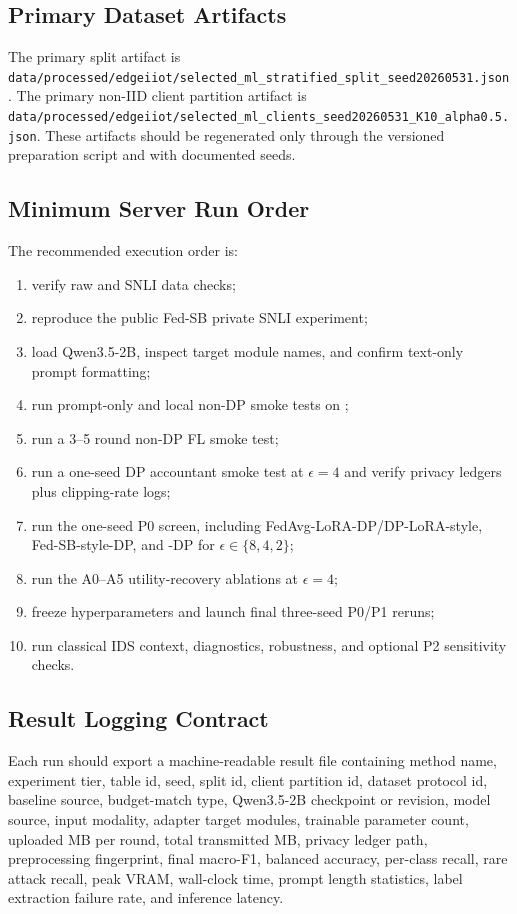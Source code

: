 \subsection{Primary Dataset Artifacts}
The primary split artifact is \texttt{data/processed/edgeiiot/selected\_ml\_stratified\_split\_seed20260531.json}. The primary non-IID client partition artifact is \texttt{data/processed/edgeiiot/selected\_ml\_clients\_seed20260531\_K10\_alpha0.5.json}. These artifacts should be regenerated only through the versioned preparation script and with documented seeds.

\subsection{Minimum Server Run Order}
The recommended execution order is:
\begin{enumerate}[leftmargin=*]
  \item verify raw \dataset{} and SNLI data checks;
  \item reproduce the public Fed-SB private SNLI experiment;
  \item load Qwen3.5-2B, inspect target module names, and confirm text-only prompt formatting;
  \item run prompt-only and local non-DP \core{} smoke tests on \dataset{};
  \item run a 3--5 round non-DP FL smoke test;
  \item run a one-seed DP accountant smoke test at $\epsilon=4$ and verify privacy ledgers plus clipping-rate logs;
  \item run the one-seed P0 screen, including FedAvg-LoRA-DP/DP-LoRA-style, Fed-SB-style-DP, and \method{}-DP for $\epsilon\in\{8,4,2\}$;
  \item run the A0--A5 utility-recovery ablations at $\epsilon=4$;
  \item freeze hyperparameters and launch final three-seed P0/P1 reruns;
  \item run classical IDS context, diagnostics, robustness, and optional P2 sensitivity checks.
\end{enumerate}

\subsection{Result Logging Contract}
Each run should export a machine-readable result file containing method name, experiment tier, table id, seed, split id, client partition id, dataset protocol id, baseline source, budget-match type, Qwen3.5-2B checkpoint or revision, model source, input modality, adapter target modules, trainable parameter count, uploaded MB per round, total transmitted MB, privacy ledger path, preprocessing fingerprint, final macro-F1, balanced accuracy, per-class recall, rare attack recall, peak VRAM, wall-clock time, prompt length statistics, label extraction failure rate, and inference latency.
